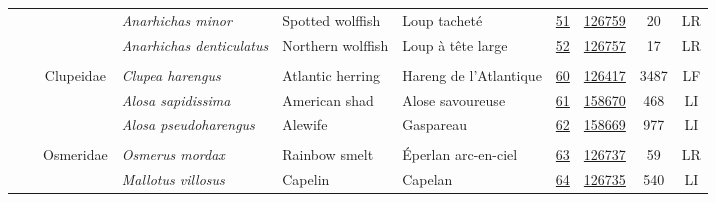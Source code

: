 \documentclass[12pt]{article}\usepackage[]{graphicx}\usepackage[]{color}
\begin{document}
\begin{landscapepage}
\begin{longtable}[t]{ccc>{\centering\arraybackslash}p{3cm}>{\centering\arraybackslash}p{3cm}>{\centering\arraybackslash}p{3cm}>{}c>{}ccc}
\nopagebreak
\hspace{1em}\hspace{1em} &  &  & \em{Anarhichas minor} & Spotted wolffish & Loup tacheté & \href{#sec:51}{51} & \href{http://www.marinespecies.org/aphia.php?p=taxdetails&id=126759}{126759} & 20 & LR\\
\nopagebreak
\hspace{1em}\hspace{1em} &  &  & \em{Anarhichas denticulatus} & Northern wolffish & Loup à tête large & \href{#sec:52}{52} & \href{http://www.marinespecies.org/aphia.php?p=taxdetails&id=126757}{126757} & 17 & LR\\
\nopagebreak
\addlinespace[0.3em]
\\
\hspace{1em}\hspace{1em} &  & Clupeidae & \em{Clupea harengus} & Atlantic herring & Hareng de l'Atlantique & \href{#sec:60}{60} & \href{http://www.marinespecies.org/aphia.php?p=taxdetails&id=126417}{126417} & 3487 & LF\\
\nopagebreak
\hspace{1em}\hspace{1em} &  &  & \em{Alosa sapidissima} & American shad & Alose savoureuse & \href{#sec:61}{61} & \href{http://www.marinespecies.org/aphia.php?p=taxdetails&id=158670}{158670} & 468 & LI\\
\nopagebreak
\hspace{1em}\hspace{1em} &  &  & \em{Alosa pseudoharengus} & Alewife & Gaspareau & \href{#sec:62}{62} & \href{http://www.marinespecies.org/aphia.php?p=taxdetails&id=158669}{158669} & 977 & LI\\
\nopagebreak
\addlinespace[0.3em]
\\
\hspace{1em}\hspace{1em} &  & Osmeridae & \em{Osmerus mordax} & Rainbow smelt & Éperlan arc-en-ciel & \href{#sec:63}{63} & \href{http://www.marinespecies.org/aphia.php?p=taxdetails&id=126737}{126737} & 59 & LR\\
\nopagebreak
\hspace{1em}\hspace{1em} &  &  & \em{Mallotus villosus} & Capelin & Capelan & \href{#sec:64}{64} & \href{http://www.marinespecies.org/aphia.php?p=taxdetails&id=126735}{126735} & 540 & LI\\

\end{longtable}
\end{landscapepage}
\end{document}

